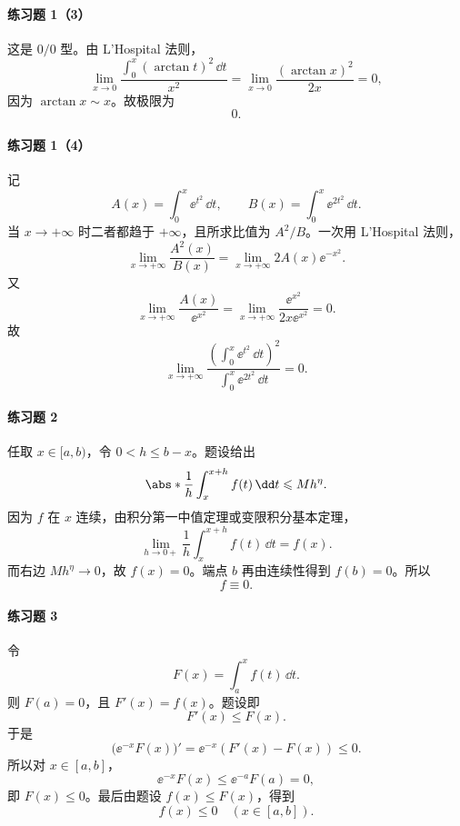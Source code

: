 \paragraph{练习题 1（3）}
\begin{xsolution}
这是 $0/0$ 型。由 L'Hospital 法则，
\[
  \lim_{x\to0}\frac{\int_0^x(\arctan t)^2\,\dd t}{x^2}
  =\lim_{x\to0}\frac{(\arctan x)^2}{2x}=0,
\]
因为 $\arctan x\sim x$。故极限为
\[
  \boxed{0}.
\]
\end{xsolution}

\paragraph{练习题 1（4）}
\begin{xsolution}
记
\[
  A(x)=\int_0^x\ee^{t^2}\,\dd t,
  \qquad
  B(x)=\int_0^x\ee^{2t^2}\,\dd t.
\]
当 $x\to+\infty$ 时二者都趋于 $+\infty$，且所求比值为 $A^2/B$。一次用 L'Hospital 法则，
\[
  \lim_{x\to+\infty}\frac{A^2(x)}{B(x)}
  =\lim_{x\to+\infty}2A(x)\ee^{-x^2}.
\]
又
\[
  \lim_{x\to+\infty}\frac{A(x)}{\ee^{x^2}}
  =\lim_{x\to+\infty}\frac{\ee^{x^2}}{2x\ee^{x^2}}
  =0.
\]
故
\[
  \boxed{\lim_{x\to+\infty}\frac{\left(\int_0^x\ee^{t^2}\,\dd t\right)^2}
  {\int_0^x\ee^{2t^2}\,\dd t}=0}.
\]
\end{xsolution}

\paragraph{练习题 2}
\begin{xsolution}
任取 $x\in[a,b)$，令 $0<h\leqslant b-x$。题设给出
\[
  \abs*{\frac1h\int_x^{x+h}f(t)\,\dd t}\leqslant Mh^\eta.
\]
因为 $f$ 在 $x$ 连续，由积分第一中值定理或变限积分基本定理，
\[
  \lim_{h\to0+}\frac1h\int_x^{x+h}f(t)\,\dd t=f(x).
\]
而右边 $Mh^\eta\to0$，故 $f(x)=0$。端点 $b$ 再由连续性得到 $f(b)=0$。所以
\[
  f\equiv0.
\]
\end{xsolution}

\paragraph{练习题 3}
\begin{xsolution}
令
\[
  F(x)=\int_a^x f(t)\,\dd t.
\]
则 $F(a)=0$，且 $F'(x)=f(x)$。题设即
\[
  F'(x)\leqslant F(x).
\]
于是
\[
  \bigl(\ee^{-x}F(x)\bigr)'=\ee^{-x}(F'(x)-F(x))\leqslant0.
\]
所以对 $x\in[a,b]$，
\[
  \ee^{-x}F(x)\leqslant\ee^{-a}F(a)=0,
\]
即 $F(x)\leqslant0$。最后由题设 $f(x)\leqslant F(x)$，得到
\[
  \boxed{f(x)\leqslant0\quad(x\in[a,b])}.
\]
\end{xsolution}

